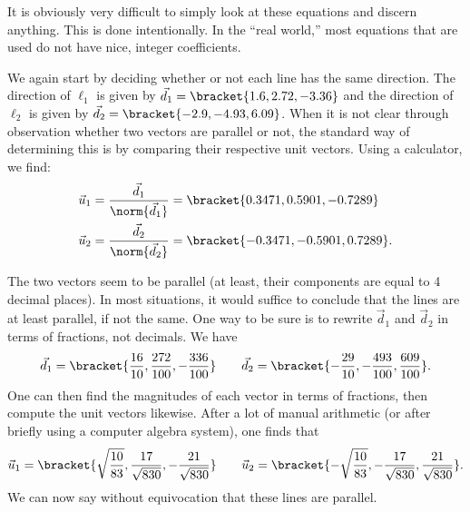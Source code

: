 {It is obviously very difficult to simply look at these equations and discern anything. This is done intentionally. In the ``real world,'' most equations that are used do not have nice, integer coefficients.%

We again start by deciding whether or not each line has the same direction. The direction of $\ell_1$ is given by $\vec d_1 =\bracket{1.6,2.72,-3.36}$ and the direction of $\ell_2$ is given by $\vec d_2 =\bracket{-2.9,-4.93,6.09}$. When it is not clear through observation whether two vectors are parallel or not, the standard way of determining this is by comparing their respective unit vectors. Using a calculator, we find:
\begin{align*}
\vec u_1 &= \frac{\vec d_1}{\norm{\vec d_1}} =\bracket{0.3471,0.5901,-0.7289}\\
 \vec u_2 &= \frac{\vec d_2}{\norm{\vec d_2}} =\bracket{-0.3471,-0.5901,0.7289}.
\end{align*}

The two vectors seem to be parallel (at least, their components are equal to 4 decimal places). In most situations, it would suffice to conclude that the lines are at least parallel, if not the same. One way to be sure is to rewrite $\vec d_1$ and $\vec d_2$ in terms of fractions, not decimals. We have 
\[\vec d_1 =\bracket{\frac{16}{10},\frac{272}{100},-\frac{336}{100}}\qquad \vec d_2 =\bracket{-\frac{29}{10},-\frac{493}{100},\frac{609}{100}}.\]
One can then find the magnitudes of each vector in terms of fractions, then compute the unit vectors likewise. After a lot of manual arithmetic (or after briefly using a computer algebra system), one finds that 
\[\vec u_1 =\bracket{\sqrt{\frac{10}{83}},\frac{17}{\sqrt{830}},-\frac{21}{\sqrt{830}}}\qquad \vec u_2 =\bracket{-\sqrt{\frac{10}{83}},-\frac{17}{\sqrt{830}},\frac{21}{\sqrt{830}}}.\]
We can now say without equivocation that these lines are parallel.

}
